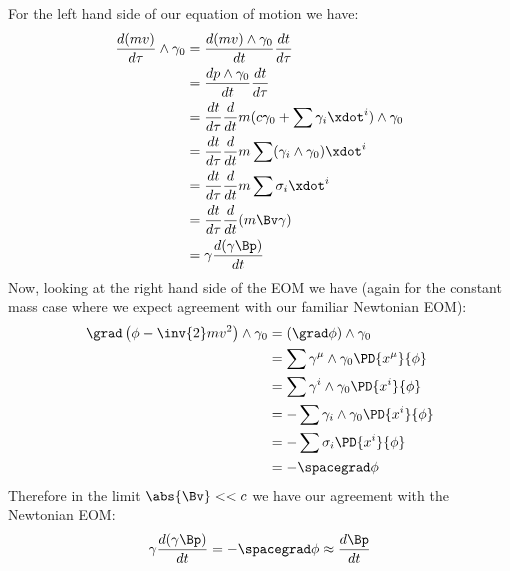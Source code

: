 For the left hand side of our equation of motion  we have:
%
\begin{equation}\label{eqn:massVaryLagrangian:220}
\begin{aligned}
\frac{d (m v)}{d\tau} \wedge \gamma_0
&= \frac{ d (m v) \wedge \gamma_0 }{dt} \frac{dt}{d\tau} \\
&= \frac{ d p \wedge \gamma_0 }{dt} \frac{dt}{d\tau} \\
&= \frac{dt}{d\tau} \frac{ d }{dt} m (c \gamma_0 + \sum \gamma_i \xdot^i ) \wedge \gamma_0 \\
&= \frac{dt}{d\tau} \frac{ d }{dt} m \sum (\gamma_i \wedge \gamma_0) \xdot^i  \\
&= \frac{dt}{d\tau} \frac{ d }{dt} m \sum \sigma_i \xdot^i  \\
&= \frac{dt}{d\tau} \frac{ d }{dt} (m \Bv \gamma) \\
&= \gamma \frac{ d (\gamma \Bp) }{dt}
\end{aligned}
\end{equation}
%
Now, looking at the right hand side of the EOM we have (again for the constant mass case where we expect agreement with our familiar Newtonian EOM):
%
\begin{equation}\label{eqn:massVaryLagrangian:240}
\begin{aligned}
\grad \left(\phi - \inv{2} m v^2 \right) \wedge \gamma_0
&= (\grad \phi) \wedge \gamma_0 \\
&= \sum \gamma^{\mu} \wedge \gamma_0 \PD{x^{\mu}}{\phi} \\
&= \sum \gamma^{i} \wedge \gamma_0 \PD{x^{i}}{\phi} \\
&= -\sum \gamma_{i} \wedge \gamma_0 \PD{x^{i}}{\phi} \\
&= -\sum \sigma_i \PD{x^{i}}{\phi} \\
&= - \spacegrad \phi
\end{aligned}
\end{equation}
%
Therefore in the limit \(\abs{\Bv} << c\) we have our agreement with the Newtonian EOM:
%
\begin{equation}
\gamma \frac{ d (\gamma \Bp) }{dt} = - \spacegrad \phi \approx \frac{d\Bp}{dt}
\end{equation}

